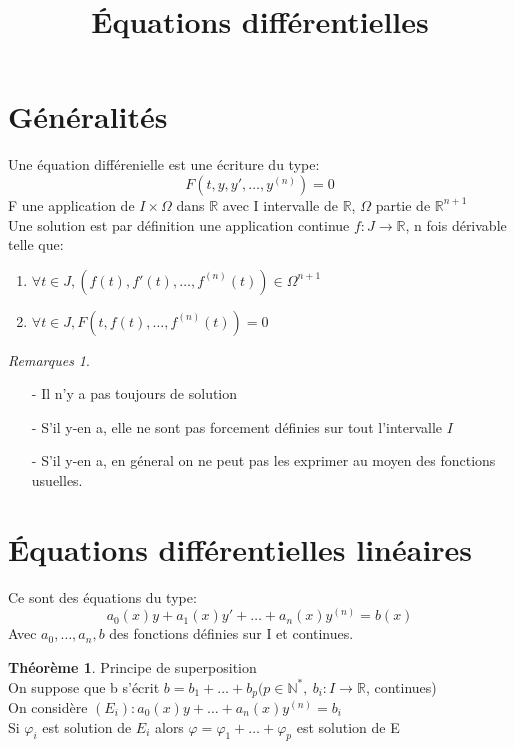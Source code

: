 \documentclass[fleqn]{article}
\title{\'Equations diff\'erentielles}
\date{}
\theoremstyle{definition} \newtheorem*{defi}{D\'efinition}
\theoremstyle{definition} \newtheorem*{theo}{Th\'eor\`eme}
\theoremstyle{remark} \newtheorem*{rqs}{Remarques}
\begin{document}
\maketitle

\section{G\'en\'eralit\'es}
Une \'equation diff\'erenielle est une \'ecriture du type:
\[F(t, y, y', \hdots, y^{(n)}) = 0\]
F une application de $I \times \Omega$ dans $\mathbb{R}$ avec I intervalle de $\mathbb{R}$, $\Omega$ partie de $\mathbb{R}^{n+1}$\\
Une solution est par d\'efinition une application continue $f:J\rightarrow \mathbb{R}$, n fois d\'erivable telle que:
\begin{enumerate}
	\item $\forall t \in J, (f(t), f'(t), \hdots, f^{(n)}(t)) \in \Omega^{n+1}$
	\item $\forall t \in J, F(t, f(t), \hdots, f^{(n)}(t)) = 0$
\end{enumerate}

\begin{rqs} $ $
	\begin{itemize}
		\item [-] Il n'y a pas toujours de solution
		\item [-] S'il y-en a, elle ne sont pas forcement d\'efinies sur tout l'intervalle $I$
		\item [-] S'il y-en a, en g\'eneral on ne peut pas les exprimer au moyen des fonctions usuelles.
	\end{itemize}
\end{rqs}

\section{\'Equations diff\'erentielles lin\'eaires}
Ce sont des \'equations du type:
\[a_0(x)y + a_1(x)y' + \hdots + a_n(x)y^{(n)} = b(x)\]
Avec $a_0, \hdots, a_n, b$ des fonctions d\'efinies sur I et continues.\\

\begin{theo} Principe de superposition \\
	On suppose que b s'\'ecrit $b = b_1 + \hdots + b_p (p \in \mathbb{N}^{*},\ b_i : I \rightarrow \mathbb{R}$,  continues)\\
	On consid\`ere $(E_i): a_0(x)y + \hdots + a_n(x) y^{(n)} = b_i$ \\
	Si $\varphi_i$ est solution de $E_i$ alors $\varphi = \varphi_1 + \hdots + \varphi_p$ est solution de E
\end{theo}
\end{document}
